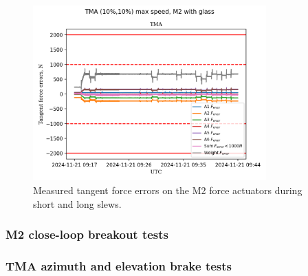 \begin{figure}
    \centering
    \includegraphics[width=0.8\textwidth]{spa/M2_short_long_slews_tangent_force_errors_10.png}
    \caption{Measured tangent force errors on the M2 force actuators during short and long slews.}
    \label{fig:m2_short_long_slews_tangent_errors}
    \end{figure}

\subsubsection{M2 close-loop breakout tests}
\label{subsubsec:m2_close_loop_breakout_tests}

\subsubsection{TMA azimuth and elevation brake tests}
\label{subsubsec:tma_azimuth_and_elevation_brake_tests}


